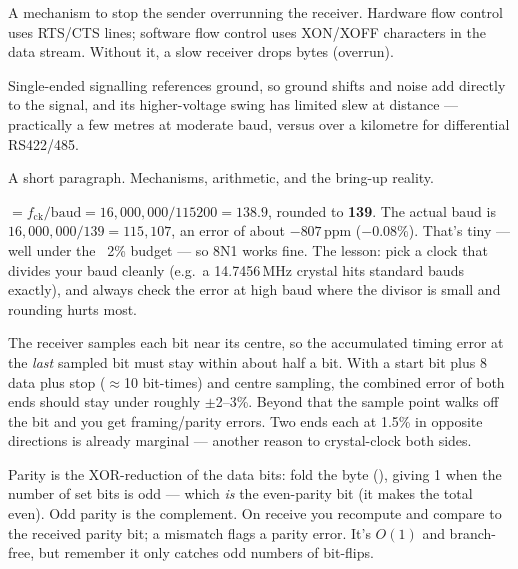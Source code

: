 A mechanism to stop the sender overrunning the receiver. Hardware flow control
uses RTS/CTS lines; software flow control uses XON/XOFF characters in the data
stream. Without it, a slow receiver drops bytes (overrun).

Single-ended signalling references ground, so ground shifts and noise add
directly to the signal, and its higher-voltage swing has limited slew at
distance --- practically a few metres at moderate baud, versus over a kilometre
for differential RS422/485.

%
{A short paragraph. Mechanisms, arithmetic, and the bring-up reality.}

$=f_{\text{ck}}/\text{baud}=16{,}000{,}000/115200=138.9$, rounded to
\textbf{139}. The actual baud is $16{,}000{,}000/139 = 115{,}107$, an error of
about $-807$\,ppm ($-0.08\%$). That's tiny --- well under the ~2\% budget --- so
8N1 works fine. The lesson: pick a clock that divides your baud cleanly (e.g.\
a 14.7456\,MHz crystal hits standard bauds exactly), and always check the error
at high baud where the divisor is small and rounding hurts most.

The receiver samples each bit near its centre, so the accumulated timing error
at the \emph{last} sampled bit must stay within about half a bit. With a start
bit plus 8 data plus stop ($\approx$10 bit-times) and centre sampling, the
combined error of both ends should stay under roughly $\pm$2--3\%. Beyond that
the sample point walks off the bit and you get framing/parity errors. Two ends
each at 1.5\% in opposite directions is already marginal --- another reason to
crystal-clock both sides.

Parity is the XOR-reduction of the data bits: fold the byte
(), giving 1 when the number of
set bits is odd --- which \emph{is} the even-parity bit (it makes the total
even). Odd parity is the complement. On receive you recompute and compare to
the received parity bit; a mismatch flags a parity error. It's $O(1)$ and
branch-free, but remember it only catches odd numbers of bit-flips.

